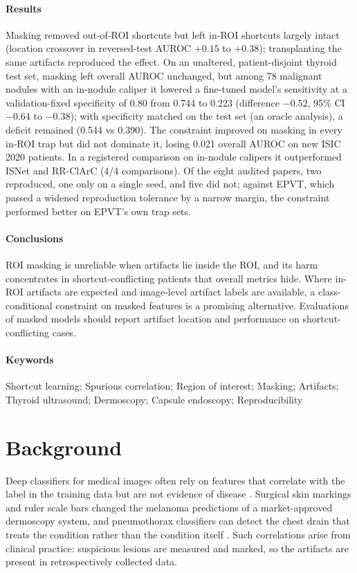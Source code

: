 \documentclass[12pt]{article}
\begin{document}
\paragraph{Results} Masking removed out-of-ROI shortcuts but left in-ROI shortcuts largely intact (location crossover in
reversed-test AUROC $+0.15$ to $+0.38$); transplanting the same artifacts reproduced the effect. On an unaltered,
patient-disjoint thyroid test set, masking left overall AUROC unchanged, but among 78 malignant nodules with an
in-nodule caliper it lowered a fine-tuned model's sensitivity at a validation-fixed specificity of 0.80 from 0.744 to
0.223 (difference $-0.52$, 95\% CI $-0.64$ to $-0.38$); with specificity matched on the test set (an oracle analysis), a
deficit remained (0.544 vs 0.390). The constraint improved on masking in every in-ROI trap but did not dominate it,
losing 0.021 overall AUROC on new ISIC 2020 patients. In a registered comparison on in-nodule calipers it outperformed
ISNet and RR-ClArC (4/4 comparisons). Of the eight audited papers, two reproduced, one only on a single seed, and five
did not; against EPVT, which passed a widened reproduction tolerance by a narrow margin, the constraint performed better
on EPVT's own trap sets.

\paragraph{Conclusions} ROI masking is unreliable when artifacts lie inside the ROI, and its harm concentrates in
shortcut-conflicting patients that overall metrics hide. Where in-ROI artifacts are expected and image-level artifact
labels are available, a class-conditional constraint on masked features is a promising alternative. Evaluations of
masked models should report artifact location and performance on shortcut-conflicting cases.

\paragraph{Keywords} Shortcut learning; Spurious correlation; Region of interest; Masking; Artifacts; Thyroid
ultrasound; Dermoscopy; Capsule endoscopy; Reproducibility

\section*{Background}
Deep classifiers for medical images often rely on features that correlate with the label in the training data but are
not evidence of disease \cite{geirhos2020shortcut,degrave2021ai}. Surgical skin markings \cite{winkler2019markings} and
ruler scale bars \cite{winkler2021scalebars} changed the melanoma predictions of a market-approved dermoscopy system,
and pneumothorax classifiers can detect the chest drain that treats the condition rather than the condition itself
\cite{oakden2020hidden,rueckel2021pneumothorax,jimenez2023shortcuts}. Such correlations arise from clinical practice:
suspicious lesions are measured and marked, so the artifacts are present in retrospectively collected data.
\end{document}
